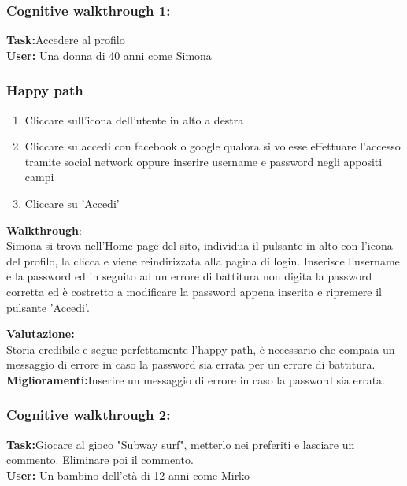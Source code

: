 \documentclass[../Report.tex]{subfiles}
\begin{document}
    \subsubsection{Cognitive walkthrough 1:}
    \textbf{Task:}Accedere al profilo\\
    \textbf{User:} Una donna di 40 anni come Simona
    \subsubsection{Happy path}
    \begin{enumerate}
        \item Cliccare sull'icona dell'utente in alto a destra
        \item Cliccare su accedi con facebook o google qualora si volesse effettuare l'accesso tramite social network oppure inserire username e password negli appositi campi
        \item Cliccare su 'Accedi'
    \end{enumerate}
    \textbf{Walkthrough}:\\
    Simona si trova nell'Home page del sito, individua il pulsante in alto con l'icona del profilo, la clicca e viene reindirizzata alla pagina di login.
    Inserisce l'username e la password ed in seguito ad un errore di battitura non digita la password corretta ed è costretto a modificare la password appena inserita e ripremere il pulsante 'Accedi'.

    \textbf{Valutazione:}\\Storia credibile e segue perfettamente l'happy path, è necessario che compaia un messaggio di errore in caso la password sia errata per un errore di battitura.\\

    \textbf{Miglioramenti:}Inserire un messaggio di errore in caso la password sia errata.\\

    \subsubsection{Cognitive walkthrough 2:}
    \textbf{Task:}Giocare al gioco "Subway surf", metterlo nei preferiti e lasciare un commento. Eliminare poi il commento.\\
    \textbf{User:} Un bambino dell'età di 12 anni come Mirko
\end{document}
